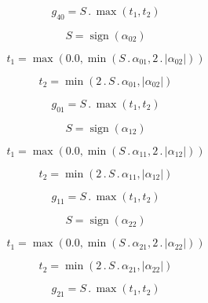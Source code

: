 \documentclass{article}
\begin{document}
\begin{dmath}g_{40} = S \,.\, \max\left(t_{1}, t_{2}\right)\end{dmath}

\begin{dmath}S = \operatorname{sign}{\left (\alpha_{02} \right )}\end{dmath}

\begin{dmath}t_{1} = \max\left(0.0, \min\left(S \,.\, \alpha_{01}, 2 \,.\, \left|{\alpha_{02}}\right|\right)\right)\end{dmath}

\begin{dmath}t_{2} = \min\left(2 \,.\, S \,.\, \alpha_{01}, \left|{\alpha_{02}}\right|\right)\end{dmath}

\begin{dmath}g_{01} = S \,.\, \max\left(t_{1}, t_{2}\right)\end{dmath}

\begin{dmath}S = \operatorname{sign}{\left (\alpha_{12} \right )}\end{dmath}

\begin{dmath}t_{1} = \max\left(0.0, \min\left(S \,.\, \alpha_{11}, 2 \,.\, \left|{\alpha_{12}}\right|\right)\right)\end{dmath}

\begin{dmath}t_{2} = \min\left(2 \,.\, S \,.\, \alpha_{11}, \left|{\alpha_{12}}\right|\right)\end{dmath}

\begin{dmath}g_{11} = S \,.\, \max\left(t_{1}, t_{2}\right)\end{dmath}

\begin{dmath}S = \operatorname{sign}{\left (\alpha_{22} \right )}\end{dmath}

\begin{dmath}t_{1} = \max\left(0.0, \min\left(S \,.\, \alpha_{21}, 2 \,.\, \left|{\alpha_{22}}\right|\right)\right)\end{dmath}

\begin{dmath}t_{2} = \min\left(2 \,.\, S \,.\, \alpha_{21}, \left|{\alpha_{22}}\right|\right)\end{dmath}

\begin{dmath}g_{21} = S \,.\, \max\left(t_{1}, t_{2}\right)\end{dmath}
\end{document}
